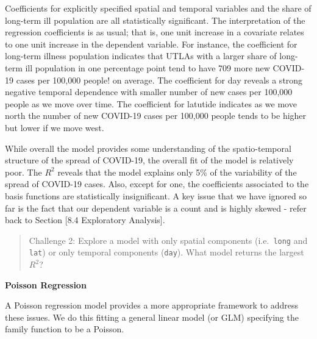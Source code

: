 \documentclass[
]{book}
\newenvironment{Shaded}{\begin{snugshade}}{\end{snugshade}}
\newcommand{\CommentTok}[1]{\textcolor[rgb]{0.56,0.35,0.01}{\textit{#1}}}
\newcommand{\DataTypeTok}[1]{\textcolor[rgb]{0.13,0.29,0.53}{#1}}
\newcommand{\KeywordTok}[1]{\textcolor[rgb]{0.13,0.29,0.53}{\textbf{#1}}}
\newcommand{\NormalTok}[1]{#1}
\newcommand{\OperatorTok}[1]{\textcolor[rgb]{0.81,0.36,0.00}{\textbf{#1}}}
\newcommand{\StringTok}[1]{\textcolor[rgb]{0.31,0.60,0.02}{#1}}
\begin{document}
Coefficients for explicitly specified spatial and temporal variables and the share of long-term ill population are all statistically significant. The interpretation of the regression coefficients is as usual; that is, one unit increase in a covariate relates to one unit increase in the dependent variable. For instance, the coefficient for long-term illness population indicates that UTLAs with a larger share of long-term ill population in one percentage point tend to have 709 more new COVID-19 cases per 100,000 people! on average. The coefficient for day reveals a strong negative temporal dependence with smaller number of new cases per 100,000 people as we move over time. The coefficient for latutide indicates as we move north the number of new COVID-19 cases per 100,000 people tends to be higher but lower if we move west.

While overall the model provides some understanding of the spatio-temporal structure of the spread of COVID-19, the overall fit of the model is relatively poor. The \(R^{2}\) reveals that the model explains only 5\% of the variability of the spread of COVID-19 cases. Also, except for one, the coefficients associated to the basis functions are statistically insignificant. A key issue that we have ignored so far is the fact that our dependent variable is a count and is highly skewed - refer back to Section {[}8.4 Exploratory Analysis{]}.

\begin{quote}
Challenge 2: Explore a model with only spatial components (i.e.~\texttt{long} and \texttt{lat}) or only temporal components (\texttt{day}). What model returns the largest \(R^{2}\)?
\end{quote}

\textbf{Poisson Regression}

A Poisson regression model provides a more appropriate framework to address these issues. We do this fitting a general linear model (or GLM) specifying the family function to be a Poisson.

\begin{Shaded}
\end{Shaded}
\end{document}
